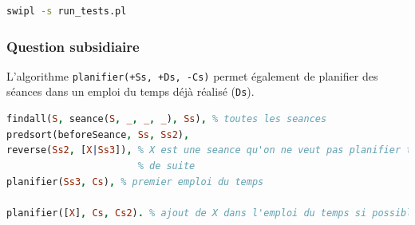 \begin{lstlisting}[language=bash, caption=Lancer les tests, captionpos=b]
swipl -s run_tests.pl
\end{lstlisting}


\subsubsection{Question subsidiaire}

L'algorithme \texttt{planifier(+Ss, +Ds, -Cs)} permet également de planifier des
séances dans un emploi du temps déjà réalisé (\texttt{Ds}).

\begin{lstlisting}[language=Prolog, caption=Exemple d'ajout dans un EDT, captionpos=b,
label={lst:plus}]
findall(S, seance(S, _, _, _), Ss), % toutes les seances
predsort(beforeSeance, Ss, Ss2),
reverse(Ss2, [X|Ss3]), % X est une seance qu'on ne veut pas planifier tout
                       % de suite
planifier(Ss3, Cs), % premier emploi du temps

planifier([X], Cs, Cs2). % ajout de X dans l'emploi du temps si possible
\end{lstlisting}

